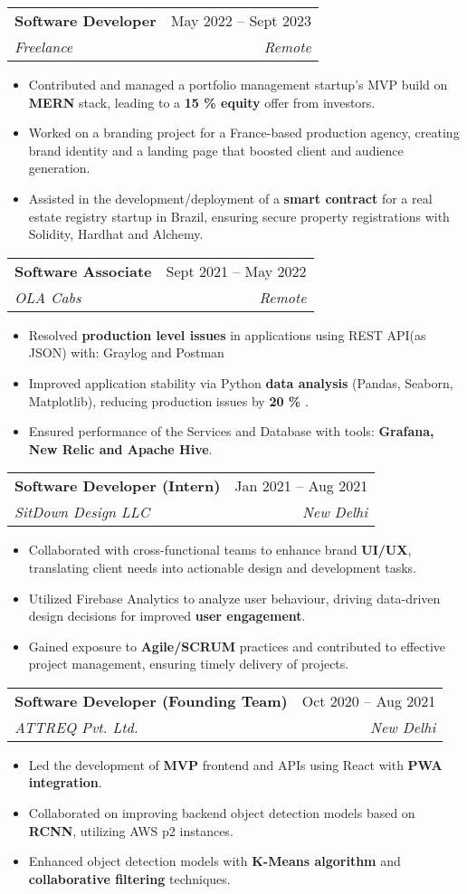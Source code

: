 \documentclass[letterpaper,11pt]{article}
\makeatletter
\newcommand{\resumeItem}[1]{
  \item\small{
    {#1 \vspace{-2pt}}
  }
}
\newcommand{\resumeSubheading}[4]{
  \vspace{-2pt}\item
    \begin{tabular*}{0.97\textwidth}[t]{l@{\extracolsep{\fill}}r}
      \textbf{#1} & #2 \\
      \textit{\small#3} & \textit{\small #4} \\
    \end{tabular*}\vspace{-7pt}
}
\newcommand{\resumeSubSubheading}[2]{
    \item
    \begin{tabular*}{0.97\textwidth}{l@{\extracolsep{\fill}}r}
      \textit{\small#1} & \textit{\small #2} \\
    \end{tabular*}\vspace{-7pt}
}
\newcommand{\resumeSubHeadingListEnd}{\end{itemize}}
\newcommand{\resumeItemListStart}{\begin{itemize}}
\newcommand{\resumeItemListEnd}{\end{itemize}\vspace{-5pt}}
\makeatother
\begin{document}
  \resumeSubheading
      {Software Developer}{May 2022 -- Sept 2023}
      {Freelance}{Remote}
      \resumeItemListStart
        \resumeItem{Contributed and managed a portfolio management startup's MVP build on \textbf{MERN} stack, leading to a \textbf{15 \% equity} offer from investors.}
        \resumeItem{Worked on a branding project for a France-based production agency, creating brand identity and a landing page that boosted client and audience generation.}
        \resumeItem{Assisted in the development/deployment of a \textbf{smart contract} for a real estate registry startup in Brazil, ensuring secure property registrations with Solidity, Hardhat and Alchemy.}
      \resumeItemListEnd

    \resumeSubheading
      {Software Associate}{Sept 2021 -- May 2022}
      {OLA Cabs}{Remote}
      \resumeItemListStart
        \resumeItem{Resolved \textbf{production level issues} in applications using REST API(as JSON) with: Graylog and Postman}
        \resumeItem{Improved application stability via Python \textbf{data analysis} (Pandas, Seaborn, Matplotlib), reducing production issues by \textbf{20 \%} .}
        \resumeItem{Ensured performance of the Services and Database with tools: \textbf{Grafana, New Relic and Apache Hive}.}
      \resumeItemListEnd
      


    \resumeSubheading
      {Software Developer (Intern)}{Jan 2021 -- Aug 2021}
      {SitDown Design LLC}{New Delhi}
      \resumeItemListStart
        \resumeItem{Collaborated with cross-functional teams to enhance brand \textbf{UI/UX}, translating client needs into actionable design and development tasks.}
        \resumeItem{Utilized Firebase Analytics to analyze user behaviour, driving data-driven design decisions for improved \textbf{user engagement}.}
        \resumeItem{Gained exposure to \textbf{Agile/SCRUM }practices and contributed to effective project management, ensuring timely delivery of projects.}
    \resumeItemListEnd

    \resumeSubheading
      {Software Developer (Founding Team)}{Oct 2020 -- Aug 2021}
      {ATTREQ Pvt. Ltd.}{New Delhi}
      \resumeItemListStart
        \resumeItem{Led the development of \textbf{MVP} frontend and APIs using React with \textbf{PWA integration}.}
        \resumeItem{Collaborated on improving backend object detection models based on \textbf{RCNN}, utilizing AWS p2 instances.}
        \resumeItem{Enhanced object detection models with \textbf{K-Means algorithm} and \textbf{collaborative filtering} techniques.}
      \resumeItemListEnd
\end{document}
